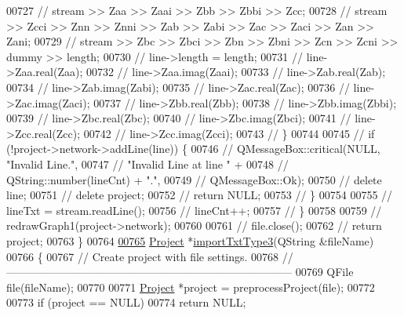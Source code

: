 \begin{DoxyCode}
00727 \textcolor{comment}{//      stream >> Zaa >> Zaai >> Zbb >> Zbbi >> Zcc;}
00728 \textcolor{comment}{//      stream >> Zcci >> Znn >> Znni >> Zab >> Zabi >> Zac >> Zaci >> Zan >> Zani;}
00729 \textcolor{comment}{//      stream >> Zbc >> Zbci >> Zbn >> Zbni >> Zcn >> Zcni >> dummy >> length;}
00730 \textcolor{comment}{//      line->length = length;}
00731 \textcolor{comment}{//      line->Zaa.real(Zaa);}
00732 \textcolor{comment}{//      line->Zaa.imag(Zaai);}
00733 \textcolor{comment}{//      line->Zab.real(Zab);}
00734 \textcolor{comment}{//      line->Zab.imag(Zabi);}
00735 \textcolor{comment}{//      line->Zac.real(Zac);}
00736 \textcolor{comment}{//      line->Zac.imag(Zaci);}
00737 \textcolor{comment}{//      line->Zbb.real(Zbb);}
00738 \textcolor{comment}{//      line->Zbb.imag(Zbbi);}
00739 \textcolor{comment}{//      line->Zbc.real(Zbc);}
00740 \textcolor{comment}{//      line->Zbc.imag(Zbci);}
00741 \textcolor{comment}{//      line->Zcc.real(Zcc);}
00742 \textcolor{comment}{//      line->Zcc.imag(Zcci);}
00743 \textcolor{comment}{//    \}}
00744 
00745 \textcolor{comment}{//    if (!project->network->addLine(line)) \{}
00746 \textcolor{comment}{//      QMessageBox::critical(NULL, "Invalid Line.",}
00747 \textcolor{comment}{//                            "Invalid Line at line " +}
00748 \textcolor{comment}{//                            QString::number(lineCnt) + ".",}
00749 \textcolor{comment}{//                            QMessageBox::Ok);}
00750 \textcolor{comment}{//      delete line;}
00751 \textcolor{comment}{//      delete project;}
00752 \textcolor{comment}{//      return NULL;}
00753 \textcolor{comment}{//    \}}
00754 
00755 \textcolor{comment}{//    lineTxt = stream.readLine();}
00756 \textcolor{comment}{//    lineCnt++;}
00757 \textcolor{comment}{//  \}}
00758 
00759 \textcolor{comment}{//  redrawGraph1(project->network);}
00760 
00761 \textcolor{comment}{//  file.close();}
00762 \textcolor{comment}{//  return project;}
00763 \}
00764 
\hypertarget{import_8cpp_source_l00765}{}\hyperlink{import_8h_ac1810dcefba801e18ee9900ed6c0ff82}{00765} \hyperlink{class_project}{Project} *\hyperlink{import_8cpp_ac1810dcefba801e18ee9900ed6c0ff82}{importTxtType3}(QString &fileName)
00766 \{
00767 \textcolor{comment}{// Create project with file settings.}
00768 \textcolor{comment}{//------------------------------------------------------------------------------}
00769   QFile file(fileName);
00770 
00771   \hyperlink{class_project}{Project} *project = preprocessProject(file);
00772 
00773   \textcolor{keywordflow}{if} (project == NULL)
00774     \textcolor{keywordflow}{return} NULL;

\end{DoxyCode}
